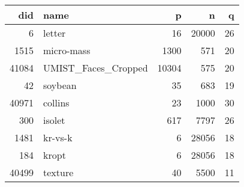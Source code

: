 %
\addtolength{\tabcolsep}{-3pt}
\begin{tabular}{rlrrr}
\toprule
did &                 name &      p &     n &  q  \\
\midrule 
6 & letter &  16 & 20000 & 26 \\
1515 & micro-mass  & 1300 & 571 & 20 \\
41084 & UMIST\_Faces\_Cropped  & 10304 & 575 & 20 \\ 
42 & soybean  & 35 & 683 & 19 \\
40971 & collins  & 23 & 1000 & 30  \\
300 & isolet  & 617 & 7797 & 26 \\
1481 & kr-vs-k  & 6 & 28056 & 18 \\
184 & kropt  & 6 & 28056 & 18 \\
40499 & texture  & 40 & 5500 & 11 \\
\bottomrule
\end{tabular}
\addtolength{\tabcolsep}{3pt}
\normalsize